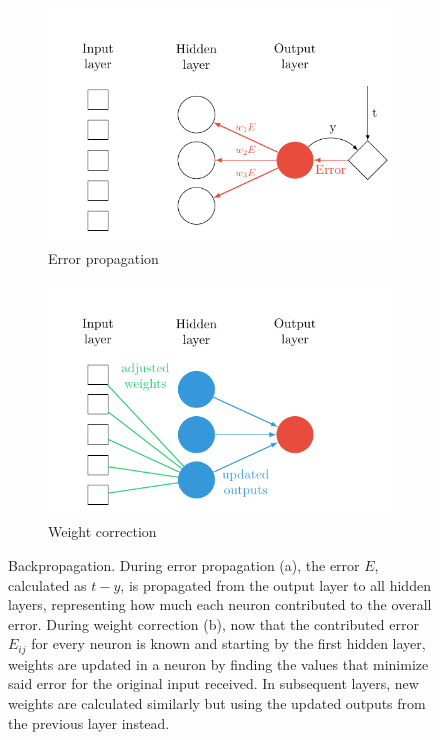 \begin{figure}[t]
  \begin{subfigure}[b]{0.5\textwidth}
    \includegraphics[width=\textwidth]{tkz/mlffnn-backpropagation-1}
    \caption{Error propagation}
    \label{fig:sec:theory:mlffnn:backprop-1}
  \end{subfigure}
  \hfill
  \begin{subfigure}[b]{0.5\textwidth}
    \includegraphics[width=\textwidth]{tkz/mlffnn-backpropagation-2}
    \caption{Weight correction}
    \label{fig:sec:theory:mlffnn:backprop-2}
  \end{subfigure}
  \caption{
    Backpropagation.
    During error propagation (a), the error $E$, calculated as $t - y$, is propagated from the output layer to all hidden layers, representing how much each neuron contributed to the overall error.
    During weight correction (b), now that the contributed error $E_{ij}$ for every neuron is known and starting by the first hidden layer, weights are updated in a neuron by finding the values that minimize said error for the original input received.
    In subsequent layers, new weights are calculated similarly but using the updated outputs from the previous layer instead.
  }
  \label{fig:sec:theory:mlffnn:backprop}
\end{figure}

